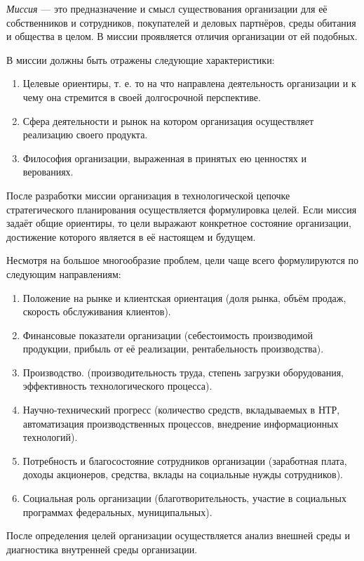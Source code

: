 \documentclass[12pt, russian, oneside, article]{ncc}
\begin{document}
\emph{Миссия} --- это предназначение и смысл существования организации для её собственников и сотрудников, покупателей и деловых партнёров, среды обитания и общества в целом. В миссии проявляется отличия организации от ей подобных.

В миссии должны быть отражены следующие характеристики:
\begin{enumerate}
\item Целевые ориентиры, т. е. то на что направлена деятельность организации и к чему она стремится в своей долгосрочной перспективе.
\item Сфера деятельности и рынок на котором организация осуществляет реализацию своего продукта.
\item Философия организации, выраженная в принятых ею ценностях и верованиях.
\end{enumerate}

После разработки миссии организация в технологической цепочке стратегического планирования осуществляется формулировка целей. Если миссия задаёт общие ориентиры, то цели выражают конкретное состояние организации, достижение которого является в её настоящем и будущем.

Несмотря на большое многообразие проблем, цели чаще всего формулируются по следующим направлениям:
\begin{enumerate}
\item Положение на рынке и клиентская ориентация (доля рынка, объём продаж, скорость обслуживания клиентов).
\item Финансовые показатели организации (себестоимость производимой продукции, прибыль от её реализации, рентабельность производства).
\item Производство. (производительность труда, степень загрузки оборудования, эффективность технологического процесса).
\item Научно-технический прогресс (количество средств, вкладываемых в НТР, автоматизация производственных процессов, внедрение информационных технологий).
\item Потребность и благосостояние сотрудников организации (заработная плата, доходы акционеров, средства, вклады на социальные нужды сотрудников).
\item Социальная роль организации (благотворительность, участие в социальных программах федеральных, муниципальных).
\end{enumerate}

После определения целей организации осуществляется анализ внешней среды и диагностика внутренней среды организации.
\end{document}
